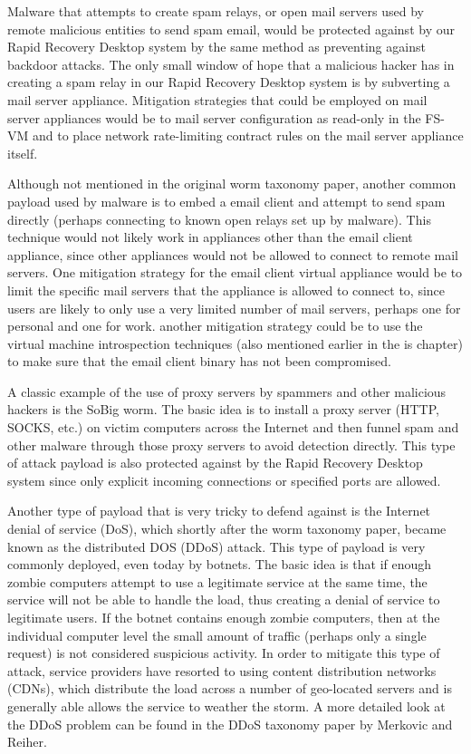 Malware that attempts to create spam relays, or open mail servers used by remote malicious entities to send spam email, would be protected against by our Rapid Recovery Desktop system by the same method as preventing against backdoor attacks. The only small window of hope that a malicious hacker has in creating a spam relay in our Rapid Recovery Desktop system is by subverting a mail server appliance. Mitigation strategies that could be employed on mail server appliances would be to mail server configuration as read-only in the FS-VM and to place network rate-limiting contract rules on the mail server appliance itself.

Although not mentioned in the original worm taxonomy paper, another common payload used by malware is to embed a email client and attempt to send spam directly (perhaps connecting to known open relays set up by malware). This technique would not likely work in appliances other than the email client appliance, since other appliances would not be allowed to connect to remote mail servers. One mitigation strategy for the email client virtual appliance would be to limit the specific mail servers that the appliance is allowed to connect to, since users are likely to only use a very limited number of mail servers, perhaps one for personal and one for work. another mitigation strategy could be to use the virtual machine introspection techniques (also mentioned earlier in the is chapter) to make sure that the email client binary has not been compromised. 

A classic example of the use of proxy servers by spammers and other malicious hackers is the SoBig worm. The basic idea is to install a proxy server (HTTP, SOCKS, etc.) on victim computers across the Internet and then funnel spam and other malware through those proxy servers to avoid detection directly. This type of attack payload is also protected against by the Rapid Recovery Desktop system since only explicit incoming connections or specified ports are allowed.

Another type of payload that is very tricky to defend against is the Internet denial of service (DoS), which shortly after the worm taxonomy paper, became known as the distributed DOS (DDoS) attack. This type of payload is very commonly deployed, even today by botnets. The basic idea is that if enough zombie computers attempt to use a legitimate service at the same time, the service will not be able to handle the load, thus creating a denial of service to legitimate users. If the botnet contains enough zombie computers, then at the individual computer level the small amount of traffic (perhaps only a single request) is not considered suspicious activity. In order to mitigate this type of attack, service providers have resorted to using content distribution networks (CDNs), which distribute the load across a number of geo-located servers and is generally able allows the service to weather the storm. A more detailed look at the DDoS problem can be found in the DDoS taxonomy paper by Merkovic and Reiher\cite{DDoS_taxonomy_2004}.

